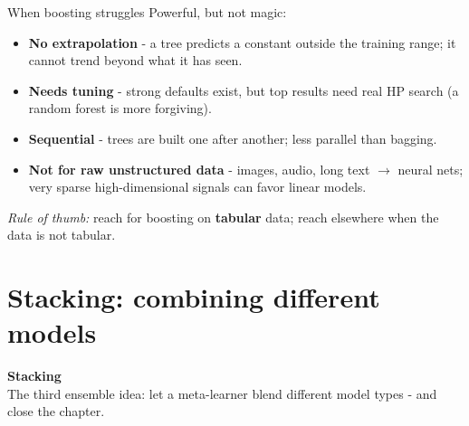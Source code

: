 \documentclass[aspectratio=169]{beamer}
\newcommand{\sectiontransition}[2]{%
  \begin{frame}[plain]
    \vfill
    \begin{center}
      {\Large\color{popblue}\textbf{#1}}\\[10pt]
      {\normalsize #2}
    \end{center}
    \vfill
  \end{frame}}
\begin{document}
\begin{frame}{When boosting struggles}
  Powerful, but not magic:
  \begin{itemize}\small
    \item \textbf{No extrapolation} - a tree predicts a constant outside the training range; it
      cannot trend beyond what it has seen.
    \item \textbf{Needs tuning} - strong defaults exist, but top results need real HP search
      (a random forest is more forgiving).
    \item \textbf{Sequential} - trees are built one after another; less parallel than bagging.
    \item \textbf{Not for raw unstructured data} - images, audio, long text $\to$ neural nets; very
      sparse high-dimensional signals can favor linear models.
  \end{itemize}
  \vfill
  \footnotesize \emph{Rule of thumb:} reach for boosting on \textbf{tabular} data; reach elsewhere
  when the data is not tabular.
\end{frame}

\section{Stacking: combining different models}
\sectiontransition{Stacking}{The third ensemble idea: let a meta-learner blend different model types - and close the chapter.}
\end{document}
